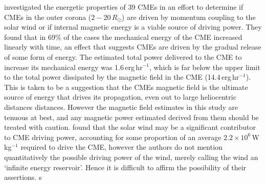 \citep{subram2007} investigated the energetic properties of 39 CMEs in an effort to determine if CMEs in the outer corona ($2-20\,R_{\odot}$) are driven by momentum coupling to the solar wind or if internal magnetic energy is a viable source of driving power. They found that in 69\% of the cases the mechanical energy of the CME increased linearly with time, an effect that suggests CMEs are driven by the gradual release of some form of energy. The estimated total power delivered to the CME to increase its mechanical energy was 1.6\,erg\,hr$^{-1}$, which is far below the upper limit to the total power dissipated by the magnetic field in the CME (14.4\,erg\,hr$^{-1}$). This is taken to be a suggestion that the CMEs magnetic field is the ultimate source of energy that drives its propagation, even out to large heliocentric distances distances. However the magnetic field estimates in this study are tenuous at best, and any magnetic power estimated derived from them should be treated with caution. \citet{lewis2002} found that the solar wind may be a significant contributor to CME driving power, accounting for some proportion of an average $2.2\times10^6$\,W\,kg$^{-1}$ required to drive the CME, however the authors do not mention quantitatively the possible driving power of the wind, merely calling the wind an \textquoteleft infinite energy reservoir'. Hence it is difficult to affirm the possibility of their assertions.
s

